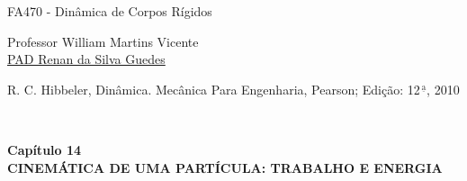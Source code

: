 \begin{center}
	\begin{huge}
		FA470 - Dinâmica de Corpos Rígidos\\\vspace{.8cm}
	\end{huge}
	\begin{large}
		Professor William Martins Vicente\\\vspace{.5cm}
		\href{https://github.com/renanGuedes10/}{PAD Renan da Silva Guedes}\\\vspace{.8cm}
	\end{large}
	\begin{Large}
		R. C. Hibbeler, Dinâmica. Mecânica Para Engenharia, Pearson; Edição: 12$^{\,\underline{\text{a}}}$, 2010
	\end{Large}\\\vspace{.2cm}
	\begin{large}
		\textbf{Capítulo 14}\\\vspace{.3cm}
		\textbf{CINEMÁTICA DE UMA PARTÍCULA: TRABALHO E ENERGIA}
	\end{large}
\end{center}   
